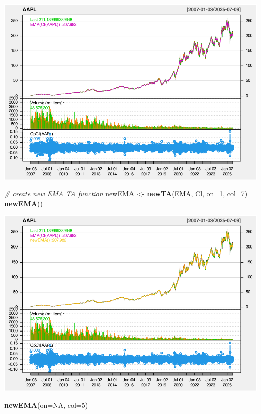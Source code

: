 \documentclass[]{ctexbook}
\newenvironment{Shaded}{\begin{snugshade}}{\end{snugshade}}
\newcommand{\AttributeTok}[1]{\textcolor[rgb]{0.13,0.29,0.53}{#1}}
\newcommand{\CommentTok}[1]{\textcolor[rgb]{0.56,0.35,0.01}{\textit{#1}}}
\newcommand{\ConstantTok}[1]{\textcolor[rgb]{0.56,0.35,0.01}{#1}}
\newcommand{\DecValTok}[1]{\textcolor[rgb]{0.00,0.00,0.81}{#1}}
\newcommand{\FunctionTok}[1]{\textcolor[rgb]{0.13,0.29,0.53}{\textbf{#1}}}
\newcommand{\NormalTok}[1]{#1}
\newcommand{\OtherTok}[1]{\textcolor[rgb]{0.56,0.35,0.01}{#1}}
\begin{document}
\includegraphics[width=0.9\linewidth]{quantmod_files/figure-latex/newta-3}

\begin{Shaded}
\begin{Highlighting}[]
\CommentTok{\# create new EMA TA function}
\NormalTok{newEMA }\OtherTok{\textless{}{-}} \FunctionTok{newTA}\NormalTok{(EMA, Cl, }\AttributeTok{on=}\DecValTok{1}\NormalTok{, }\AttributeTok{col=}\DecValTok{7}\NormalTok{)}
\FunctionTok{newEMA}\NormalTok{()}
\end{Highlighting}
\end{Shaded}

\includegraphics[width=0.9\linewidth]{quantmod_files/figure-latex/newta-4}

\begin{Shaded}
\begin{Highlighting}[]
\FunctionTok{newEMA}\NormalTok{(}\AttributeTok{on=}\ConstantTok{NA}\NormalTok{, }\AttributeTok{col=}\DecValTok{5}\NormalTok{)}
\end{Highlighting}
\end{Shaded}
\end{document}
